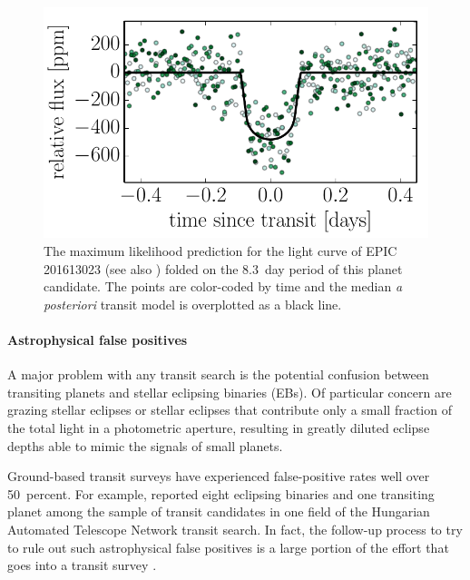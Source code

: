 \begin{figure}[p]
\begin{center}
\includegraphics{figures/ketu/folded.pdf}
\end{center}
\caption{%
The maximum likelihood prediction for the light curve of EPIC 201613023 (see
also ) folded on the 8.3~day period of this planet candidate.
The points are color-coded by time and the median \emph{a posteriori} transit
model is overplotted as a black line.
}
\end{figure}


\paragraph{Astrophysical false positives}

A major problem with any transit search is the potential confusion
between transiting planets and stellar eclipsing binaries (EBs).  Of
particular concern are grazing stellar eclipses or stellar eclipses
that contribute only a small fraction of the total light in a
photometric aperture, resulting in greatly diluted eclipse depths able
to mimic the signals of small planets.

Ground-based transit surveys have experienced false-positive rates
well over 50~percent.  For example, \citet{Latham:2009} reported eight
eclipsing binaries and one transiting planet among the sample of
transit candidates in one field of the Hungarian Automated Telescope
Network transit search.  In fact, the follow-up process to try to rule
out such astrophysical false positives is a large portion of the
effort that goes into a transit survey
\citep[e.g.,][]{Odonovan:2006,Almenara:2009,Poleski:2010}.

